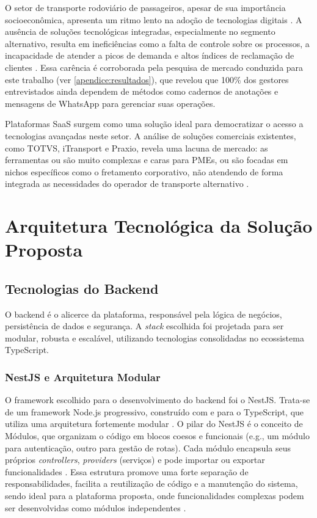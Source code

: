 O setor de transporte rodoviário de passageiros, apesar de sua importância socioeconômica, apresenta um ritmo lento na adoção de tecnologias digitais \cite{sestsenat2021relatorio}. A ausência de soluções tecnológicas integradas, especialmente no segmento alternativo, resulta em ineficiências como a falta de controle sobre os processos, a incapacidade de atender a picos de demanda e altos índices de reclamação de clientes \cite{fateczl2022impactos}. Essa carência é corroborada pela pesquisa de mercado conduzida para este trabalho (ver \autoref{apendice:resultados}), que revelou que 100\% dos gestores entrevistados ainda dependem de métodos como cadernos de anotações e mensagens de WhatsApp para gerenciar suas operações.

Plataformas SaaS surgem como uma solução ideal para democratizar o acesso a tecnologias avançadas neste setor. A análise de soluções comerciais existentes, como TOTVS, iTransport e Praxio, revela uma lacuna de mercado: as ferramentas ou são muito complexas e caras para PMEs, ou são focadas em nichos específicos como o fretamento corporativo, não atendendo de forma integrada as necessidades do operador de transporte alternativo \cite{totvs2025passageiros, itransport2025gestao, praxioluna2025venda}.

\section{Arquitetura Tecnológica da Solução Proposta}

\subsection{Tecnologias do Backend}

O backend é o alicerce da plataforma, responsável pela lógica de negócios, persistência de dados e segurança. A \textit{stack} escolhida foi projetada para ser modular, robusta e escalável, utilizando tecnologias consolidadas no ecossistema TypeScript.

\subsubsection{NestJS e Arquitetura Modular}
O framework escolhido para o desenvolvimento do backend foi o NestJS. Trata-se de um framework Node.js progressivo, construído com e para o TypeScript, que utiliza uma arquitetura fortemente modular \cite{nestjs2025framework}. O pilar do NestJS é o conceito de Módulos, que organizam o código em blocos coesos e funcionais (e.g., um módulo para autenticação, outro para gestão de rotas). Cada módulo encapsula seus próprios \textit{controllers}, \textit{providers} (serviços) e pode importar ou exportar funcionalidades \cite{nestjs2025modules}. Essa estrutura promove uma forte separação de responsabilidades, facilita a reutilização de código e a manutenção do sistema, sendo ideal para a plataforma proposta, onde funcionalidades complexas podem ser desenvolvidas como módulos independentes \cite{devanddeliver2024architecture}.

